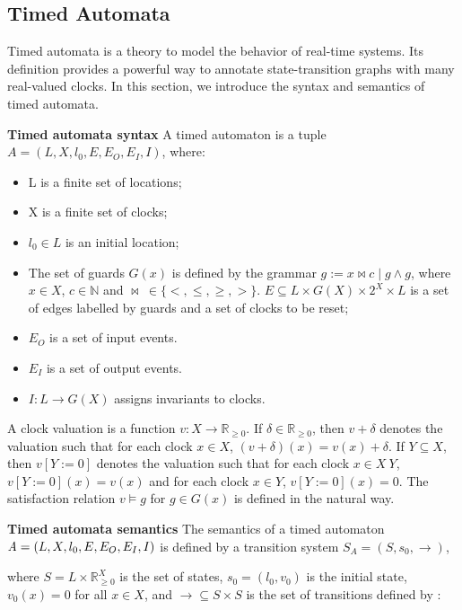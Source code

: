 \subsection{Timed Automata}
Timed automata \cite{BehrmannDLHPYH06} is a theory to model the behavior of real-time systems. Its definition provides a powerful way to annotate state-transition graphs with many real-valued clocks. In this section, we introduce the syntax and semantics of timed automata.
\begin{definition}
\textbf{Timed automata syntax}
A timed automaton is a tuple $\textit{A}=(L,X,l_{0},E,E_{O},E_{I},I)$, where:
\end{definition}
\begin{itemize}
\item
L is a finite set of locations;
\item
X is a finite set of clocks;
\item
$l_{0}\in  L$ is an initial location;
\item
The set of guards $G(x)$ is defined by the grammar $g := x \bowtie c \mid g \land g$, where $x \in X$, $c \in \mathbb{N}$ and $\bowtie~\in \{<,\leqslant,\geqslant,>\}$. $E\subseteq L \times G(X) \times 2^X \times L$ is a set of edges labelled by guards and a set of clocks to be reset;
\item
$E_{O}$ is a set of input events.
\item
$E_{I}$ is a set of output events.
\item
$I : L \rightarrow G(X)$ assigns invariants to clocks.
\end{itemize}
A clock valuation is a function $v : X \rightarrow \mathbb{R}_{\geqslant{0}}$. If $\delta \in \mathbb{R}_{\geqslant{0}}$, then $v + \delta$ denotes the valuation such that for each clock $x \in X$, $(v + \delta)(x) = v(x) + \delta$. If $Y \subseteq X$, then $v[Y := 0]$ denotes the valuation such that for each clock $x \in X~Y$, $v[Y := 0 ](x) = v(x)$ and for each clock $x \in Y$, $v[Y := 0](x) = 0$. The satisfaction relation $v \models g$ for $g \in G(x)$ is defined in the natural way.
\begin{definition}
\textbf{Timed automata semantics} 
The semantics of a timed automaton $\textit{A} = (L,X,l_{0},E, \\E_{O},E_{I},I)$ is defined by a transition system $S_{\textit{A}} = (S,s_{0},\rightarrow)$, \end{definition}
where $S = L \times \mathbb{R}_{\geqslant{0}}^X$ is the set of states, $s_{0} = (l_{0},v_{0})$ is the initial state, $v_{0}(x) = 0$ for all $x \in X$, and $\rightarrow \subseteq S \times S$ is the set of transitions defined by :
